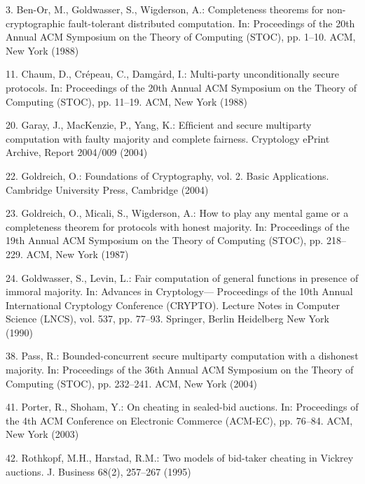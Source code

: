 \documentclass[letterpaper,11pt]{article}
\begin{document}
\begin{thebibliography}

3. Ben-Or, M., Goldwasser, S., Wigderson, A.: Completeness theorems for non-cryptographic fault-tolerant distributed computation. In: Proceedings of the 20th Annual ACM Symposium on
the Theory of Computing (STOC), pp. 1–10. ACM, New York (1988)

11. Chaum, D., Crépeau, C., Damgård, I.: Multi-party unconditionally secure protocols. In: Proceedings of the 20th Annual ACM Symposium on the Theory of Computing (STOC), pp. 11–19. ACM, New York (1988)

20. Garay, J., MacKenzie, P., Yang, K.: Efﬁcient and secure multiparty computation with faulty majority and complete fairness. Cryptology ePrint Archive, Report 2004/009 (2004)

22. Goldreich, O.: Foundations of Cryptography, vol. 2. Basic Applications. Cambridge University Press, Cambridge (2004)

23. Goldreich, O., Micali, S., Wigderson, A.: How to play any mental game or a completeness theorem for protocols with honest majority. In: Proceedings of the 19th Annual ACM Symposium on the Theory of Computing (STOC), pp. 218–229. ACM, New York (1987)

24. Goldwasser, S., Levin, L.: Fair computation of general functions in presence of immoral majority. In: Advances in Cryptology— Proceedings of the 10th Annual International Cryptology Conference (CRYPTO). Lecture Notes in Computer Science (LNCS), vol. 537, pp. 77–93. Springer, Berlin Heidelberg New York (1990)

38. Pass, R.: Bounded-concurrent secure multiparty computation with a dishonest majority. In: Proceedings of the 36th Annual ACM Symposium on the Theory of Computing (STOC), pp. 232–241. ACM, New York (2004)

41. Porter, R., Shoham, Y.: On cheating in sealed-bid auctions. In: Proceedings of the 4th ACM Conference on Electronic Commerce (ACM-EC), pp. 76–84. ACM, New York (2003)

42. Rothkopf, M.H., Harstad, R.M.: Two models of bid-taker cheating in Vickrey auctions. J. Business 68(2), 257–267 (1995)
\end{thebibliography}
\end{document}
